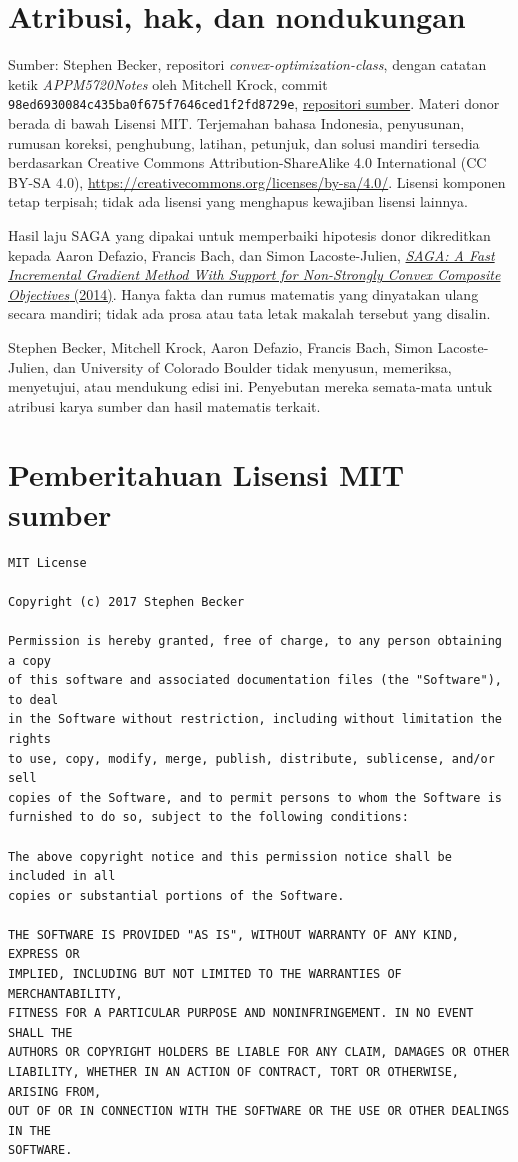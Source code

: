 \documentclass[indonesian]{shinybook}
\begin{document}
\chapter*{Atribusi, hak, dan nondukungan}
Sumber: Stephen Becker, repositori \emph{convex-optimization-class}, dengan
catatan ketik \emph{APPM5720Notes} oleh Mitchell Krock, commit
\texttt{98ed6930084c435ba0f675f7646ced1f2fd8729e},
\href{https://github.com/stephenbeckr/convex-optimization-class}{repositori sumber}.
Materi donor berada di bawah Lisensi MIT. Terjemahan bahasa Indonesia,
penyusunan, rumusan koreksi, penghubung, latihan, petunjuk, dan solusi mandiri
tersedia berdasarkan Creative Commons Attribution-ShareAlike 4.0 International
(CC BY-SA 4.0), \url{https://creativecommons.org/licenses/by-sa/4.0/}.
Lisensi komponen tetap terpisah; tidak ada lisensi yang menghapus kewajiban
lisensi lainnya.

Hasil laju SAGA yang dipakai untuk memperbaiki hipotesis donor dikreditkan
kepada Aaron Defazio, Francis Bach, dan Simon Lacoste-Julien,
\href{https://arxiv.org/abs/1407.0202}{\emph{SAGA: A Fast Incremental Gradient
Method With Support for Non-Strongly Convex Composite Objectives} (2014)}.
Hanya fakta dan rumus matematis yang dinyatakan ulang secara mandiri; tidak ada
prosa atau tata letak makalah tersebut yang disalin.

Stephen Becker, Mitchell Krock, Aaron Defazio, Francis Bach, Simon
Lacoste-Julien, dan University of Colorado Boulder tidak menyusun, memeriksa,
menyetujui, atau mendukung edisi ini. Penyebutan mereka semata-mata untuk
atribusi karya sumber dan hasil matematis terkait.

\chapter*{Pemberitahuan Lisensi MIT sumber}
\begin{verbatim}
MIT License

Copyright (c) 2017 Stephen Becker

Permission is hereby granted, free of charge, to any person obtaining a copy
of this software and associated documentation files (the "Software"), to deal
in the Software without restriction, including without limitation the rights
to use, copy, modify, merge, publish, distribute, sublicense, and/or sell
copies of the Software, and to permit persons to whom the Software is
furnished to do so, subject to the following conditions:

The above copyright notice and this permission notice shall be included in all
copies or substantial portions of the Software.

THE SOFTWARE IS PROVIDED "AS IS", WITHOUT WARRANTY OF ANY KIND, EXPRESS OR
IMPLIED, INCLUDING BUT NOT LIMITED TO THE WARRANTIES OF MERCHANTABILITY,
FITNESS FOR A PARTICULAR PURPOSE AND NONINFRINGEMENT. IN NO EVENT SHALL THE
AUTHORS OR COPYRIGHT HOLDERS BE LIABLE FOR ANY CLAIM, DAMAGES OR OTHER
LIABILITY, WHETHER IN AN ACTION OF CONTRACT, TORT OR OTHERWISE, ARISING FROM,
OUT OF OR IN CONNECTION WITH THE SOFTWARE OR THE USE OR OTHER DEALINGS IN THE
SOFTWARE.
\end{verbatim}
\end{document}
